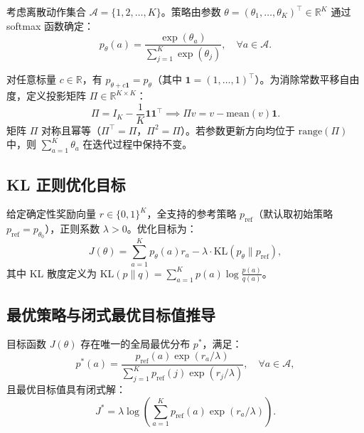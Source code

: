\documentclass[11pt, a4paper, UTF8]{ctexart}
\begin{document}
考虑离散动作集合 $\mathcal{A} = \{1, 2, \dots, K\}$。策略由参数 $\theta = (\theta_1, \dots, \theta_K)^\top \in \mathbb{R}^K$ 通过 softmax 函数确定：
\begin{equation}
    p_\theta(a) = \frac{\exp(\theta_a)}{\sum_{j=1}^K \exp(\theta_j)}, \quad \forall a \in \mathcal{A}.
    \label{eq:softmax}
\end{equation}

对任意标量 $c \in \mathbb{R}$，有 $p_{\theta + c \mathbf{1}} = p_\theta$（其中 $\mathbf{1} = (1, \dots, 1)^\top$）。为消除常数平移自由度，定义投影矩阵 $\Pi \in \mathbb{R}^{K \times K}$：
\begin{equation}
    \Pi = I_K - \frac{1}{K} \mathbf{1}\mathbf{1}^\top \implies \Pi v = v - \mathrm{mean}(v)\mathbf{1}.
\end{equation}
矩阵 $\Pi$ 对称且幂等（$\Pi^\top = \Pi$，$\Pi^2 = \Pi$）。若参数更新方向均位于 $\mathrm{range}(\Pi)$ 中，则 $\sum_{a=1}^K \theta_a$ 在迭代过程中保持不变。

\subsection{KL 正则优化目标}

给定确定性奖励向量 $r \in \{0, 1\}^K$，全支持的参考策略 $p_{\mathrm{ref}}$（默认取初始策略 $p_{\mathrm{ref}} = p_{\theta_0}$），正则系数 $\lambda > 0$。优化目标为：
\begin{equation}
    J(\theta) = \sum_{a=1}^K p_\theta(a) r_a - \lambda \cdot \mathrm{KL}(p_\theta \parallel p_{\mathrm{ref}}),
    \label{eq:objective}
\end{equation}
其中 KL 散度定义为 $\mathrm{KL}(p \parallel q) = \sum_{a=1}^K p(a) \log \frac{p(a)}{q(a)}$。

\subsection{最优策略与闭式最优目标值推导}

\begin{derivbox}
目标函数 $J(\theta)$ 存在唯一的全局最优分布 $p^*$，满足：
\begin{equation}
    p^*(a) = \frac{p_{\mathrm{ref}}(a) \exp(r_a / \lambda)}{\sum_{j=1}^K p_{\mathrm{ref}}(j) \exp(r_j / \lambda)}, \quad \forall a \in \mathcal{A},
    \label{eq:optimal_policy}
\end{equation}
且最优目标值具有闭式解：
\begin{equation}
    J^* = \lambda \log \left( \sum_{a=1}^K p_{\mathrm{ref}}(a) \exp(r_a / \lambda) \right).
    \label{eq:optimal_value}
\end{equation}
\end{derivbox}
\end{document}
